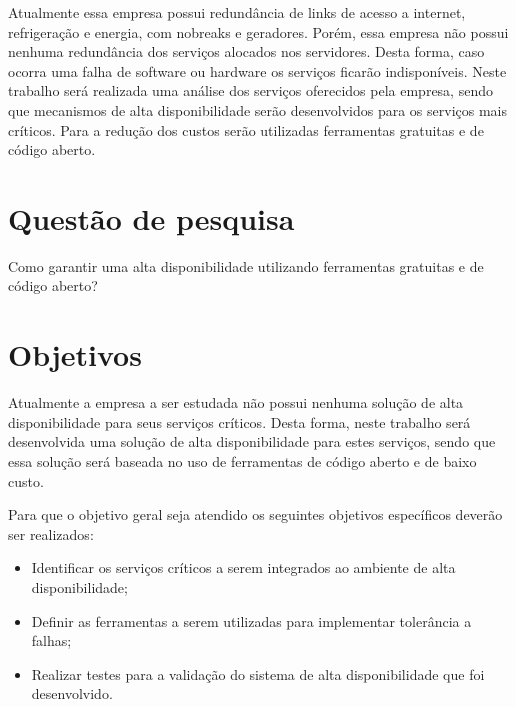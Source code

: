 Atualmente essa empresa possui redundância de links de acesso a internet, refrigeração e energia, com nobreaks e geradores. Porém, essa empresa não possui nenhuma redundância dos serviços alocados nos servidores. Desta forma, caso ocorra uma falha de software ou hardware os serviços ficarão indisponíveis. Neste trabalho será realizada uma análise dos serviços oferecidos pela empresa, sendo que mecanismos de alta disponibilidade serão desenvolvidos para os serviços mais críticos. Para a redução dos custos serão utilizadas ferramentas gratuitas e de código aberto.

\section{Questão de pesquisa}
Como garantir uma alta disponibilidade utilizando ferramentas gratuitas e de código aberto?

\section{Objetivos}
Atualmente a empresa a ser estudada não possui nenhuma solução de alta disponibilidade para seus serviços críticos. Desta forma, neste trabalho será desenvolvida uma solução de alta disponibilidade para estes serviços, sendo que essa solução será baseada no uso de ferramentas de código aberto e de baixo custo.

Para que o objetivo geral seja atendido os seguintes objetivos específicos deverão ser realizados:

\begin{itemize}
\item Identificar os serviços críticos a serem integrados ao ambiente de alta disponibilidade;
\item Definir as ferramentas a serem utilizadas para implementar tolerância a falhas;
\item Realizar testes para a validação do sistema de alta disponibilidade que foi desenvolvido.
\end{itemize}
